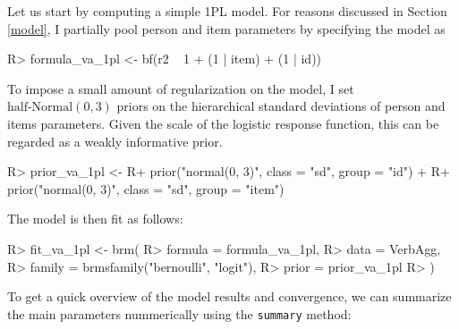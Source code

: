\documentclass[jss]{jss}
\begin{document}
Let us start by computing a simple 1PL model. For reasons discussed in
Section \ref{model}, I partially pool person and item parameters by
specifying the model as

\begin{CodeChunk}

\begin{CodeInput}
R> formula_va_1pl <- bf(r2 ~ 1 + (1 | item) + (1 | id))
\end{CodeInput}
\end{CodeChunk}

To impose a small amount of regularization on the model, I set
\(\text{half-Normal}(0, 3)\) priors on the hierarchical standard
deviations of person and items parameters. Given the scale of the
logistic response function, this can be regarded as a weakly informative
prior.

\begin{CodeChunk}

\begin{CodeInput}
R> prior_va_1pl <- 
R+   prior("normal(0, 3)", class = "sd", group = "id") + 
R+   prior("normal(0, 3)", class = "sd", group = "item")
\end{CodeInput}
\end{CodeChunk}

The model is then fit as follows:

\begin{CodeChunk}

\begin{CodeInput}
R> fit_va_1pl <- brm(
R>   formula = formula_va_1pl,
R>   data = VerbAgg, 
R>   family = brmsfamily("bernoulli", "logit"),
R>   prior = prior_va_1pl
R> )
\end{CodeInput}
\end{CodeChunk}

To get a quick overview of the model results and convergence, we can
summarize the main parameters nummerically using the \texttt{summary}
method:
\end{document}
